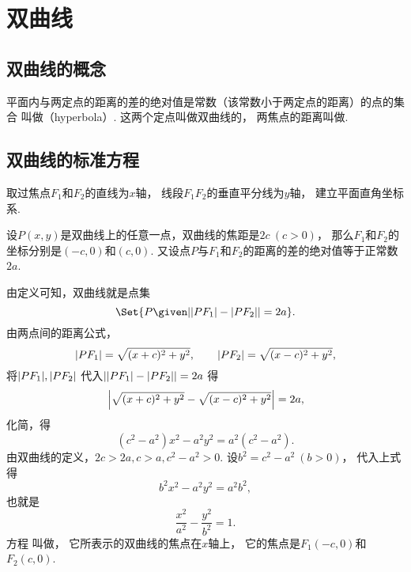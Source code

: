 \section{双曲线}
\subsection{双曲线的概念}
平面内与两定点的距离的差的绝对值是常数（该常数小于两定点的距离）的点的集合
叫做（hyperbola）.
这两个定点叫做双曲线的，
两焦点的距离叫做.

\subsection{双曲线的标准方程}
取过焦点\(F_1\)和\(F_2\)的直线为\(x\)轴，
线段\(F_1 F_2\)的垂直平分线为\(y\)轴，
建立平面直角坐标系.

设\(P(x,y)\)是双曲线上的任意一点，双曲线的焦距是\(2c\ (c>0)\)，
那么\(F_1\)和\(F_2\)的坐标分别是\((-c,0)\)和\((c,0)\).
又设点\(P\)与\(F_1\)和\(F_2\)的距离的差的绝对值等于正常数\(2a\).

由定义可知，双曲线就是点集\begin{equation*}
	\Set{ P \given \abs{\LineSegmentLength{P F_1} - \LineSegmentLength{P F_2}} = 2a }.
\end{equation*}
由两点间的距离公式，\begin{equation*}
	\abs{P F_1} = \sqrt{(x+c)^2+y^2},
	\qquad
	\abs{P F_2} = \sqrt{(x-c)^2+y^2},
\end{equation*}
将\(\abs{P F_1},\abs{P F_2}\)
代入\(\abs{\abs{P F_1} - \abs{P F_2}} = 2a\)
得\begin{equation*}
	\abs{\sqrt{(x+c)^2+y^2} - \sqrt{(x-c)^2+y^2}} = 2a,
\end{equation*}
化简，得\begin{equation*}
	(c^2-a^2) x^2 - a^2 y^2 = a^2 (c^2-a^2).
\end{equation*}
由双曲线的定义，\(
	2c > 2a,
	c > a,
	c^2 - a^2 > 0
\).
设\(b^2 = c^2 - a^2\ (b > 0)\)，
代入上式得\begin{equation*}
	b^2 x^2 - a^2 y^2 = a^2 b^2,
\end{equation*}
也就是\begin{equation}\label{equation:平面解析几何.双曲线的标准方程1}
	\frac{x^2}{a^2} - \frac{y^2}{b^2} = 1.
\end{equation}
方程  叫做，
它所表示的双曲线的焦点在\(x\)轴上，
它的焦点是\(F_1(-c,0)\)和\(F_2(c,0)\).

